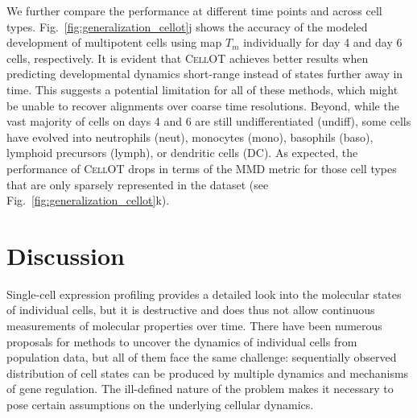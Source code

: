 We further compare the performance at different time points and across cell types.
Fig.~\ref{fig:generalization_cellot}j shows the accuracy of the modeled development of multipotent cells using map $T_m$ individually for day 4 and day 6 cells, respectively. It is evident that \textsc{CellOT} achieves better results when predicting developmental dynamics short-range instead of states further away in time.
This suggests a potential limitation for all of these methods, which might be unable to recover alignments over coarse time resolutions.
Beyond, while the vast majority of cells on days 4 and 6 are still undifferentiated (undiff), some cells have evolved into neutrophils (neut), monocytes (mono), basophils (baso), lymphoid precursors (lymph), or dendritic cells (DC).
As expected, the performance of \textsc{CellOT} drops in terms of the MMD metric for those cell types that are only sparsely represented in the dataset (see Fig.~\ref{fig:generalization_cellot}k).




\section{Discussion}


Single-cell expression profiling provides a detailed look into the molecular states of individual cells, but it is destructive and does thus not allow continuous measurements of molecular properties over time. There have been numerous proposals for methods to uncover the dynamics of individual cells from population data, but all of them face the same challenge: sequentially observed distribution of cell states can be produced by multiple dynamics and mechanisms of gene regulation. The ill-defined nature of the problem makes it necessary to pose certain assumptions on the underlying cellular dynamics.

